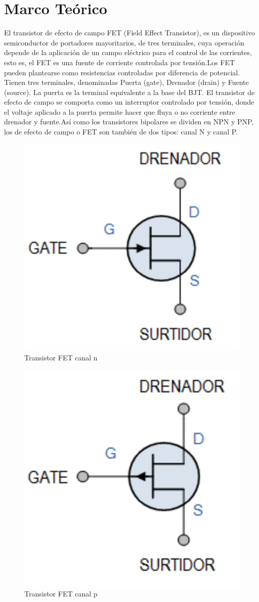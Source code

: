 \documentclass[12pt, a4paper]{article}
\begin{document}
    \section{Marco Teórico}

    El transistor de efecto de campo FET (Field Effect Transistor), es un dispositivo semiconductor de portadores mayoritarios, de tres terminales, cuya operación depende de la aplicación de un campo eléctrico para el control de las corrientes, esto es, el FET es una fuente de corriente controlada por tensión.Los FET pueden plantearse como resistencias controladas por diferencia de potencial. Tienen tres terminales, denominadas Puerta (gate), Drenador (drain) y Fuente (source). La puerta es la terminal equivalente a la base del BJT. El transistor de efecto de campo se comporta como un interruptor controlado por tensión, donde el voltaje aplicado a la puerta permite hacer que fluya o no corriente entre drenador y fuente.Así como los transistores bipolares se dividen en NPN y PNP, los de efecto de campo o FET son también de dos tipos: canal N y canal P.

    \begin{figure}[h!]
        \centering
        \includegraphics[height=5cm\textwidth]{fetn.jpg}
        \caption{Transistor FET canal n}
        \label{fig:t1}
    \end{figure}

    \begin{figure}[h!]
        \centering
        \includegraphics[height=5cm\textwidth]{fetp.jpg}
        \caption{Transistor FET canal p}
        \label{fig:t2}
    \end{figure}
\end{document}
